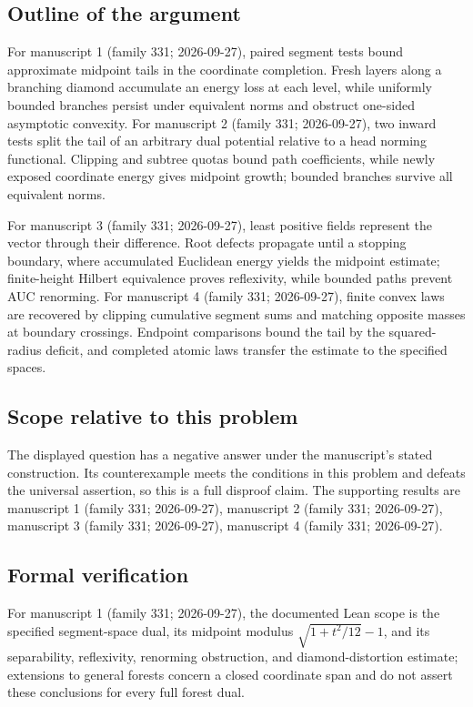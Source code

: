 \documentclass[11pt]{article}
\begin{document}
\subsection{Outline of the argument}
For manuscript 1 (family 331; 2026-09-27), paired segment tests bound approximate midpoint tails in the coordinate completion. Fresh layers along a branching diamond accumulate an energy loss at each level, while uniformly bounded branches persist under equivalent norms and obstruct one-sided asymptotic convexity. For manuscript 2 (family 331; 2026-09-27), two inward tests split the tail of an arbitrary dual potential relative to a head norming functional. Clipping and subtree quotas bound path coefficients, while newly exposed coordinate energy gives midpoint growth; bounded branches survive all equivalent norms.

For manuscript 3 (family 331; 2026-09-27), least positive fields represent the vector through their difference. Root defects propagate until a stopping boundary, where accumulated Euclidean energy yields the midpoint estimate; finite-height Hilbert equivalence proves reflexivity, while bounded paths prevent AUC renorming. For manuscript 4 (family 331; 2026-09-27), finite convex laws are recovered by clipping cumulative segment sums and matching opposite masses at boundary crossings. Endpoint comparisons bound the tail by the squared-radius deficit, and completed atomic laws transfer the estimate to the specified spaces.

\subsection{Scope relative to this problem}
The displayed question has a negative answer under the manuscript's stated construction. Its counterexample meets the conditions in this problem and defeats the universal assertion, so this is a full disproof claim. The supporting results are manuscript 1 (family 331; 2026-09-27), manuscript 2 (family 331; 2026-09-27), manuscript 3 (family 331; 2026-09-27), manuscript 4 (family 331; 2026-09-27).

\subsection{Formal verification}
For manuscript 1 (family 331; 2026-09-27), the documented Lean scope is the specified segment-space dual, its midpoint modulus $\sqrt{1+t^2/12}-1$, and its separability, reflexivity, renorming obstruction, and diamond-distortion estimate; extensions to general forests concern a closed coordinate span and do not assert these conclusions for every full forest dual.
\end{document}
